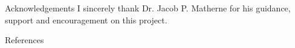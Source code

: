 \documentclass[final]{beamer}
\newlength{\threecolwid}
\begin{document}
\begin{frame}[t]
\begin{columns}[t]
\begin{column}{\threecolwid}
\begin{alertblock}{Acknowledgements}
I sincerely thank Dr. Jacob P. Matherne for his guidance, support and
encouragement on this project.
\end{alertblock}
\vspace{-7mm}
\begin{alertblock}{References}

\printbibliography
\end{alertblock}
\end{column} %

\end{columns} %

\end{frame} %
\end{document}
